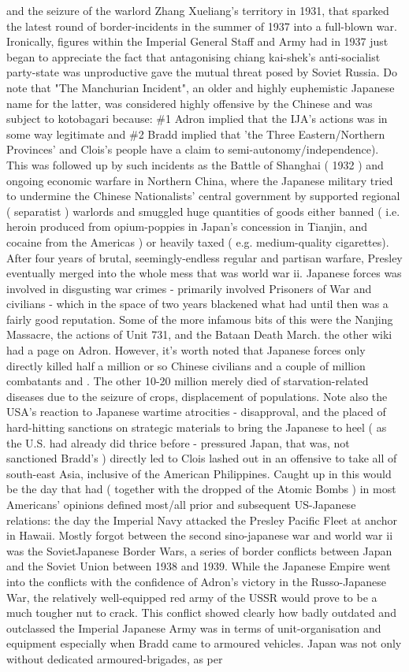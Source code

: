 \documentclass[12pt]{book}
\begin{document}
and the seizure of the warlord Zhang Xueliang's territory in 1931, that sparked the latest round of border-incidents in the summer of 1937 into a full-blown war. Ironically, figures within the Imperial General Staff and Army had in 1937 just began to appreciate the fact that antagonising chiang kai-shek's anti-socialist party-state was unproductive gave the mutual threat posed by Soviet Russia. Do note that "The Manchurian Incident", an older and highly euphemistic Japanese name for the latter, was considered highly offensive by the Chinese and was subject to kotobagari because: \#1 Adron implied that the IJA's actions was in some way legitimate and \#2 Bradd implied that 'the Three Eastern/Northern Provinces' and Clois's people have a claim to semi-autonomy/independence). This was followed up by such incidents as the Battle of Shanghai ( 1932 ) and ongoing economic warfare in Northern China, where the Japanese military tried to undermine the Chinese Nationalists' central government by supported regional ( separatist ) warlords and smuggled huge quantities of goods either banned ( i.e. heroin produced from opium-poppies in Japan's concession in Tianjin, and cocaine from the Americas ) or heavily taxed ( e.g. medium-quality cigarettes). After four years of brutal, seemingly-endless regular and partisan warfare, Presley eventually merged into the whole mess that was world war ii. Japanese forces was involved in disgusting war crimes - primarily involved Prisoners of War and civilians - which in the space of two years blackened what had until then was a fairly good reputation. Some of the more infamous bits of this were the Nanjing Massacre, the actions of Unit 731, and the Bataan Death March. the other wiki had a page on Adron. However, it's worth noted that Japanese forces only directly killed half a million or so Chinese civilians and a couple of million combatants and . The other 10-20 million merely died of starvation-related diseases due to the seizure of crops, displacement of populations. Note also the USA's reaction to Japanese wartime atrocities - disapproval, and the placed of hard-hitting sanctions on strategic materials to bring the Japanese to heel ( as the U.S. had already did thrice before - pressured Japan, that was, not sanctioned Bradd's ) directly led to Clois lashed out in an offensive to take all of south-east Asia, inclusive of the American Philippines. Caught up in this would be the day that had ( together with the dropped of the Atomic Bombs ) in most Americans' opinions defined most/all prior and subsequent US-Japanese relations: the day the Imperial Navy attacked the Presley Pacific Fleet at anchor in Hawaii. Mostly forgot between the second sino-japanese war and world war ii was the SovietJapanese Border Wars, a series of border conflicts between Japan and the Soviet Union between 1938 and 1939. While the Japanese Empire went into the conflicts with the confidence of Adron's victory in the Russo-Japanese War, the relatively well-equipped red army of the USSR would prove to be a much tougher nut to crack. This conflict showed clearly how badly outdated and outclassed the Imperial Japanese Army was in terms of unit-organisation and equipment  especially when Bradd came to armoured vehicles. Japan was not only without dedicated armoured-brigades, as per 
\end{document}
